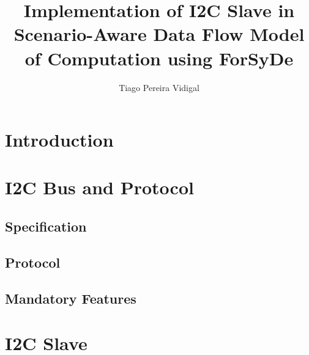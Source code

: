 \documentclass{article}
\begin{document}

\title{Implementation of I2C Slave in Scenario-Aware Data Flow Model of Computation using ForSyDe}
\author{Tiago Pereira Vidigal}
\maketitle


\section{Introduction} \label{sec-intro}


\section{I2C Bus and Protocol} \label{sec-proto}
\subsection{Specification}
\subsection{Protocol}
\subsection{Mandatory Features}


\section{I2C Slave} \label{sec-slave}
\end{document}

